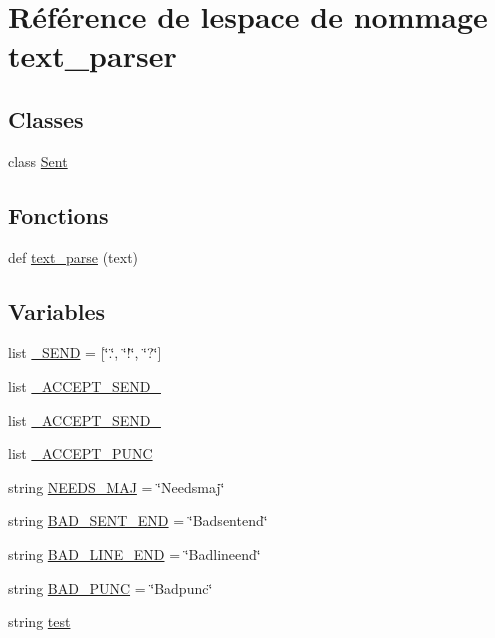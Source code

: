 \hypertarget{namespacetext__parser}{}\section{Référence de l\textquotesingle{}espace de nommage text\+\_\+parser}
\label{namespacetext__parser}
\subsection*{Classes}
\begin{DoxyCompactItemize}
\item 
class \hyperlink{classtext__parser_1_1_sent}{Sent}
\end{DoxyCompactItemize}
\subsection*{Fonctions}
\begin{DoxyCompactItemize}
\item 
def \hyperlink{namespacetext__parser_a3ae1888772dc3a5933ad236b4c2e6a45}{text\+\_\+parse} (text)
\end{DoxyCompactItemize}
\subsection*{Variables}
\begin{DoxyCompactItemize}
\item 
list \hyperlink{namespacetext__parser_a5c9971c0d0769dd5cd6dc94b2f12af95}{\+\_\+\+S\+E\+N\+D} = \mbox{[}\char`\"{}.\char`\"{}, \char`\"{}!\char`\"{}, \char`\"{}?\char`\"{}\mbox{]}
\item 
list \hyperlink{namespacetext__parser_a2423c0f051950ba04998599c28bb9ee5}{\+\_\+\+A\+C\+C\+E\+P\+T\+\_\+\+S\+E\+N\+D\+\_}
\item 
list \hyperlink{namespacetext__parser_ad4d4f9ba4881bef4ad7e51c2e1f32bf3}{\+\_\+\+A\+C\+C\+E\+P\+T\+\_\+\+S\+E\+N\+D\+\_}
\item 
list \hyperlink{namespacetext__parser_a8dc82f053dcb374290a6c60c48269593}{\+\_\+\+A\+C\+C\+E\+P\+T\+\_\+\+P\+U\+N\+C}
\item 
string \hyperlink{namespacetext__parser_a580d1a466df1af504888120208496a4e}{N\+E\+E\+D\+S\+\_\+\+M\+A\+J} = \char`\"{}Needsmaj\char`\"{}
\item 
string \hyperlink{namespacetext__parser_aae799e995dc6b572bed44911f95cc87a}{B\+A\+D\+\_\+\+S\+E\+N\+T\+\_\+\+E\+N\+D} = \char`\"{}Badsentend\char`\"{}
\item 
string \hyperlink{namespacetext__parser_ac9e29d1d799ef4dfbd672617eaae08d3}{B\+A\+D\+\_\+\+L\+I\+N\+E\+\_\+\+E\+N\+D} = \char`\"{}Badlineend\char`\"{}
\item 
string \hyperlink{namespacetext__parser_a51b23515f4a2706e48b19a9f3e03d143}{B\+A\+D\+\_\+\+P\+U\+N\+C} = \char`\"{}Badpunc\char`\"{}
\item 
string \hyperlink{namespacetext__parser_a692eca980815747967fc728d1ad2417d}{test}
\end{DoxyCompactItemize}


